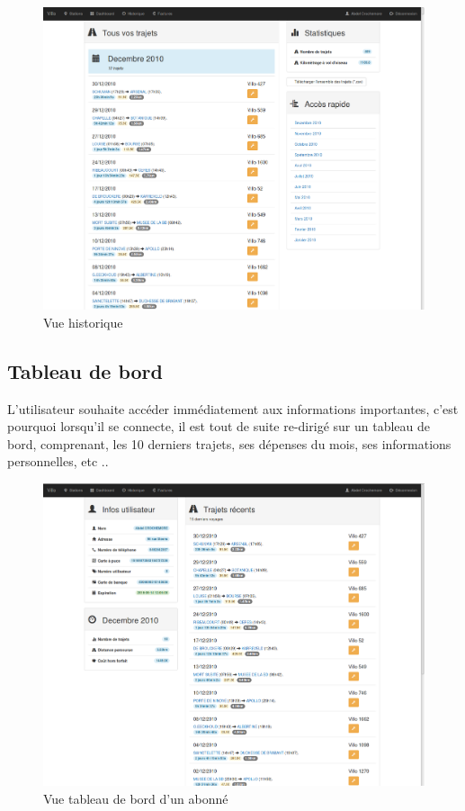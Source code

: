 \documentclass[a4paper,10pt]{article}
\begin{document}
\begin{figure}[H]
  \centering
  \includegraphics[width=.9\textwidth]{historique.png}
  \caption{\label{fig:hist} Vue historique}
\end{figure}

\subsection{Tableau de bord}
L'utilisateur souhaite accéder immédiatement aux informations importantes,
c'est pourquoi lorsqu'il se connecte, il est tout de suite re-dirigé sur
un tableau de bord, comprenant, les 10 derniers trajets, ses dépenses du mois,
ses informations personnelles, etc ..

\begin{figure}[H]
  \centering
  \includegraphics[width=.9\textwidth]{Dashboard.png}
  \caption{\label{fig:dashboard} Vue tableau de bord d'un abonné}
\end{figure}
\end{document}
